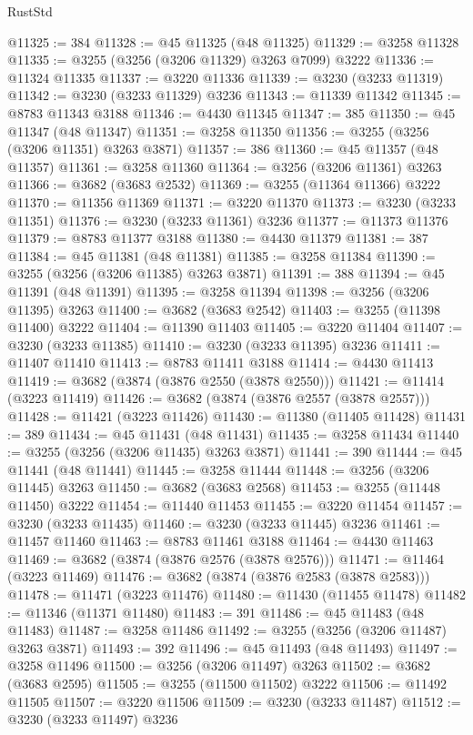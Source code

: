 \begin{lexlean}{RustStd}
\begin{coremodule}
@11325 := 384
@11328 := @45 @11325 (@48 @11325)
@11329 := @3258 @11328
@11335 := @3255 (@3256 (@3206 @11329) @3263 @7099) @3222
@11336 := @11324 @11335
@11337 := @3220 @11336
@11339 := @3230 (@3233 @11319)
@11342 := @3230 (@3233 @11329) @3236
@11343 := @11339 @11342
@11345 := @8783 @11343 @3188
@11346 := @4430 @11345
@11347 := 385
@11350 := @45 @11347 (@48 @11347)
@11351 := @3258 @11350
@11356 := @3255 (@3256 (@3206 @11351) @3263 @3871)
@11357 := 386
@11360 := @45 @11357 (@48 @11357)
@11361 := @3258 @11360
@11364 := @3256 (@3206 @11361) @3263
@11366 := @3682 (@3683 @2532)
@11369 := @3255 (@11364 @11366) @3222
@11370 := @11356 @11369
@11371 := @3220 @11370
@11373 := @3230 (@3233 @11351)
@11376 := @3230 (@3233 @11361) @3236
@11377 := @11373 @11376
@11379 := @8783 @11377 @3188
@11380 := @4430 @11379
@11381 := 387
@11384 := @45 @11381 (@48 @11381)
@11385 := @3258 @11384
@11390 := @3255 (@3256 (@3206 @11385) @3263 @3871)
@11391 := 388
@11394 := @45 @11391 (@48 @11391)
@11395 := @3258 @11394
@11398 := @3256 (@3206 @11395) @3263
@11400 := @3682 (@3683 @2542)
@11403 := @3255 (@11398 @11400) @3222
@11404 := @11390 @11403
@11405 := @3220 @11404
@11407 := @3230 (@3233 @11385)
@11410 := @3230 (@3233 @11395) @3236
@11411 := @11407 @11410
@11413 := @8783 @11411 @3188
@11414 := @4430 @11413
@11419 := @3682 (@3874 (@3876 @2550 (@3878 @2550)))
@11421 := @11414 (@3223 @11419)
@11426 := @3682 (@3874 (@3876 @2557 (@3878 @2557)))
@11428 := @11421 (@3223 @11426)
@11430 := @11380 (@11405 @11428)
@11431 := 389
@11434 := @45 @11431 (@48 @11431)
@11435 := @3258 @11434
@11440 := @3255 (@3256 (@3206 @11435) @3263 @3871)
@11441 := 390
@11444 := @45 @11441 (@48 @11441)
@11445 := @3258 @11444
@11448 := @3256 (@3206 @11445) @3263
@11450 := @3682 (@3683 @2568)
@11453 := @3255 (@11448 @11450) @3222
@11454 := @11440 @11453
@11455 := @3220 @11454
@11457 := @3230 (@3233 @11435)
@11460 := @3230 (@3233 @11445) @3236
@11461 := @11457 @11460
@11463 := @8783 @11461 @3188
@11464 := @4430 @11463
@11469 := @3682 (@3874 (@3876 @2576 (@3878 @2576)))
@11471 := @11464 (@3223 @11469)
@11476 := @3682 (@3874 (@3876 @2583 (@3878 @2583)))
@11478 := @11471 (@3223 @11476)
@11480 := @11430 (@11455 @11478)
@11482 := @11346 (@11371 @11480)
@11483 := 391
@11486 := @45 @11483 (@48 @11483)
@11487 := @3258 @11486
@11492 := @3255 (@3256 (@3206 @11487) @3263 @3871)
@11493 := 392
@11496 := @45 @11493 (@48 @11493)
@11497 := @3258 @11496
@11500 := @3256 (@3206 @11497) @3263
@11502 := @3682 (@3683 @2595)
@11505 := @3255 (@11500 @11502) @3222
@11506 := @11492 @11505
@11507 := @3220 @11506
@11509 := @3230 (@3233 @11487)
@11512 := @3230 (@3233 @11497) @3236

\end{coremodule}
\end{lexlean}
